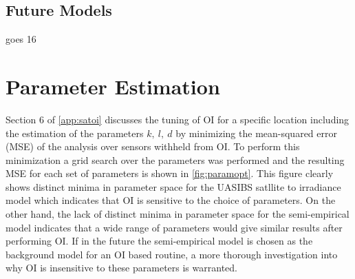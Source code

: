 \subsection{Future Models}
goes 16


\section{Parameter Estimation}
\label{sec:paramopt}

Section 6 of \cref{app:satoi} discusses the tuning of OI for a
specific location including the estimation of the parameters $k,\:
l,\: d$ by minimizing the mean-squared error (MSE) of the analysis
over sensors withheld from OI.
To perform this minimization a grid search over the parameters was
performed and the resulting MSE for each set of parameters is shown in
\cref{fig:paramopt}.
This figure clearly shows distinct minima in parameter space for the
UASIBS satllite to irradiance model which indicates that  OI is
sensitive to the choice of parameters.
On the other hand, the lack of distinct minima in parameter space for
the semi-empirical model indicates that a wide range of parameters would
give similar results after performing OI.
If in the future the semi-empirical model is chosen as the background model
for an OI based routine, a more thorough investigation into why OI is
insensitive to these parameters is warranted.


